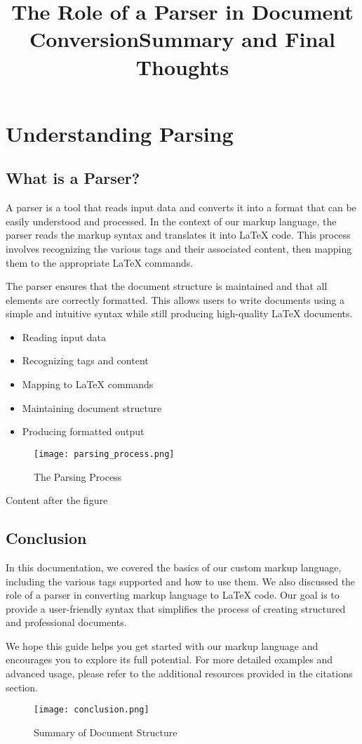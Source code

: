 \documentclass[oneside]{memoir}
\begin{document}
\newpage
\chapter{Understanding Parsing}
\section{What is a Parser?}
\title{The Role of a Parser in Document Conversion}
A parser is a tool that reads input data and converts it into a format that can be easily understood and processed. In the context of our markup language, the parser reads the markup syntax and translates it into LaTeX code. This process involves recognizing the various tags and their associated content, then mapping them to the appropriate LaTeX commands.\par
The parser ensures that the document structure is maintained and that all elements are correctly formatted. This allows users to write documents using a simple and intuitive syntax while still producing high-quality LaTeX documents.\par
\begin{itemize}
\item Reading input data
\item Recognizing tags and content
\item Mapping to LaTeX commands
\item Maintaining document structure
\item Producing formatted output
\end{itemize}
\begin{figure}
\centering
\texttt{[image: parsing\_process.png]}
\caption{The Parsing Process}
\end{figure}
Content after the figure\par

\newpage
\section{Conclusion}
\title{Summary and Final Thoughts}
In this documentation, we covered the basics of our custom markup language, including the various tags supported and how to use them. We also discussed the role of a parser in converting markup language to LaTeX code. Our goal is to provide a user-friendly syntax that simplifies the process of creating structured and professional documents.\par
We hope this guide helps you get started with our markup language and encourages you to explore its full potential. For more detailed examples and advanced usage, please refer to the additional resources provided in the citations section.\par
\begin{figure}
\centering
\texttt{[image: conclusion.png]}
\caption{Summary of Document Structure}
\end{figure}
\end{document}

